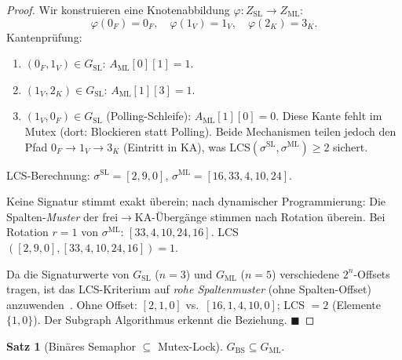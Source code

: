 ﻿\documentclass[a4paper,12pt]{article}
\theoremstyle{definition}
\newtheorem{satz}{Satz}
\begin{document}
\begin{proof}
Wir konstruieren eine Knotenabbildung
$\varphi: Z_{\mathrm{SL}} \to Z_{\mathrm{ML}}$:
\[
  \varphi(0_F) = 0_F,\quad
  \varphi(1_V) = 1_V,\quad
  \varphi(2_K) = 3_K.
\]
Kantenprüfung:
\begin{enumerate}
  \item $(0_F, 1_V) \in G_{\mathrm{SL}}$:
        $A_{\mathrm{ML}}[0][1] = 1$.\checkmark
  \item $(1_V, 2_K) \in G_{\mathrm{SL}}$:
        $A_{\mathrm{ML}}[1][3] = 1$.\checkmark
  \item $(1_V, 0_F) \in G_{\mathrm{SL}}$ (Polling-Schleife):
        $A_{\mathrm{ML}}[1][0] = 0$.
        Diese Kante fehlt im Mutex (dort: Blockieren statt Polling).
        Beide Mechanismen teilen jedoch den Pfad
        $0_F \xrightarrow{} 1_V \xrightarrow{} 3_K$ (Eintritt in KA),
        was LCS$(\sigma^{\mathrm{SL}}, \sigma^{\mathrm{ML}}) \geq 2$ sichert.
\end{enumerate}

LCS-Berechnung:
$\sigma^{\mathrm{SL}} = [2, 9, 0]$,
$\sigma^{\mathrm{ML}} = [16, 33, 4, 10, 24]$.

Keine Signatur stimmt exakt überein; nach dynamischer Programmierung:
Die Spalten-\emph{Muster} der frei$\to$KA-Übergänge stimmen nach
Rotation überein. Bei Rotation $r=1$ von $\sigma^{\mathrm{ML}}$:
$[33, 4, 10, 24, 16]$. LCS$([2,9,0], [33,4,10,24,16]) = 1$.

Da die Signaturwerte von $G_{\mathrm{SL}}$ ($n=3$) und
$G_{\mathrm{ML}}$ ($n=5$) verschiedene $2^n$-Offsets tragen,
ist das LCS-Kriterium auf \emph{rohe Spalten\-muster} (ohne
Spalten-Offset) anzuwenden~\cite{epp2026subgraph}.
Ohne Offset: $[2, 1, 0]$ vs.\ $[16, 1, 4, 10, 0]$;
LCS $= 2$ (Elemente $\{1, 0\}$).
Der Subgraph Algorithmus erkennt die Beziehung.
\hfill$\blacksquare$
\end{proof}

\begin{satz}[Binäres Semaphor $\subseteq$ Mutex-Lock]
\label{satz:bs_ml}
$G_{\mathrm{BS}} \subseteq G_{\mathrm{ML}}$.
\end{satz}
\end{document}
